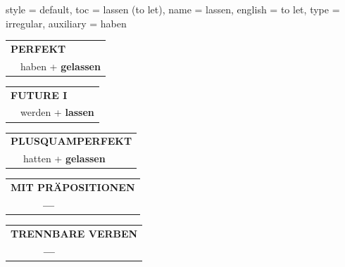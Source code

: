 \begin{verbentry}{
  style = {default},
  toc = {lassen (to let)},
  name = {lassen},
  english = {to let},
  type = {irregular},
  auxiliary = {haben}
}
    \vspace{10pt}
 
    \begin{tabular}{rl}
     \multicolumn{2}{l}{\textbf{PERFEKT}}\\
   & haben + \textbf{gelassen}\\
  \end{tabular}
\hfill
   \begin{tabular}{rl}
   
    \multicolumn{2}{l}{\textbf{FUTURE I} }\\
    &werden + \textbf{lassen}\\
 
  \end{tabular}
\hfill
   \begin{tabular}{rl}
      \multicolumn{2}{l}{\textbf{PLUSQUAMPERFEKT}}\\
   & hatten + \textbf{gelassen}\\
  \end{tabular}
  
\vspace{10pt}

\begin{tabular}{lll}
\multicolumn{3}{l}{\textbf{MIT PRÄPOSITIONEN}}\\
& \textbf{---} & \\
\end{tabular}
\hfill
\begin{tabular}{lll}
\multicolumn{3}{l}{\textbf{TRENNBARE VERBEN}}\\
& \textbf{---} & \\
\end{tabular}

\vspace{-5pt}
\end{verbentry}
